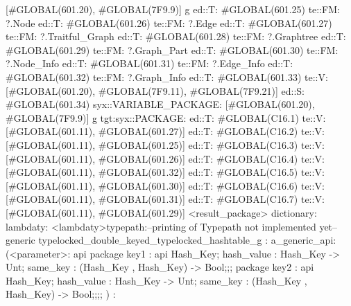                                      [#GLOBAL(601.20), #GLOBAL(7F9.9)]
                             g
                        ed::T: #GLOBAL(601.25) te::FM: ?.Node
                        ed::T: #GLOBAL(601.26) te::FM: ?.Edge
                            ed::T: #GLOBAL(601.27) te::FM: ?.Traitful_Graph
                            ed::T: #GLOBAL(601.28) te::FM: ?.Graphtree
                        ed::T: #GLOBAL(601.29) te::FM: ?.Graph_Part
                        ed::T: #GLOBAL(601.30) te::FM: ?.Node_Info
                        ed::T: #GLOBAL(601.31) te::FM: ?.Edge_Info
                        ed::T: #GLOBAL(601.32) te::FM: ?.Graph_Info
                    ed::T: #GLOBAL(601.33)
                     te::V:
                     [#GLOBAL(601.20), #GLOBAL(7F9.11), #GLOBAL(7F9.21)]
                    ed::S: #GLOBAL(601.34)
                     syx::VARIABLE_PACKAGE:
                     [#GLOBAL(601.20), #GLOBAL(7F9.9)]
                     g
                tgt:syx::PACKAGE:
                    ed::T: #GLOBAL(C16.1)
                     te::V:
                     [#GLOBAL(601.11), #GLOBAL(601.27)]
                    ed::T: #GLOBAL(C16.2)
                     te::V:
                     [#GLOBAL(601.11), #GLOBAL(601.25)]
                    ed::T: #GLOBAL(C16.3)
                     te::V:
                     [#GLOBAL(601.11), #GLOBAL(601.26)]
                    ed::T: #GLOBAL(C16.4)
                     te::V:
                     [#GLOBAL(601.11), #GLOBAL(601.32)]
                    ed::T: #GLOBAL(C16.5)
                     te::V:
                     [#GLOBAL(601.11), #GLOBAL(601.30)]
                    ed::T: #GLOBAL(C16.6)
                     te::V:
                     [#GLOBAL(601.11), #GLOBAL(601.31)]
                    ed::T: #GLOBAL(C16.7)
                     te::V:
                     [#GLOBAL(601.11), #GLOBAL(601.29)]
         <result_package>
dictionary:
lambdaty:
  <lambdaty>typepath:--printing of Typepath not implemented yet--
generic typelocked_double_keyed_typelocked_hashtable_g
:
a_generic_api:
(<parameter>:
api {   package key1
          : api {
                Hash_Key;
                hash_value : Hash_Key -> Unt;
                same_key : (Hash_Key , Hash_Key) -> Bool;};;
        package key2
          : api {
                Hash_Key;
                hash_value : Hash_Key -> Unt;
                same_key : (Hash_Key , Hash_Key) -> Bool;};;};
)
:
